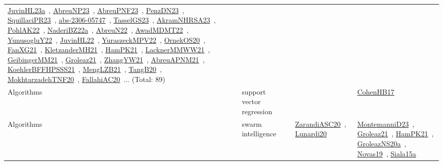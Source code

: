 {\begin{longtable}{lp{3cm}>{\raggedright\arraybackslash}p{6cm}>{\raggedright\arraybackslash}p{6cm}>{\raggedright\arraybackslash}p{8cm}}
\href{../works/JuvinHL23a.pdf}{JuvinHL23a}~\cite{JuvinHL23a}, \href{../works/AbreuNP23.pdf}{AbreuNP23}~\cite{AbreuNP23}, \href{../works/AbreuPNF23.pdf}{AbreuPNF23}~\cite{AbreuPNF23}, \href{../works/PenzDN23.pdf}{PenzDN23}~\cite{PenzDN23}, \href{../works/SquillaciPR23.pdf}{SquillaciPR23}~\cite{SquillaciPR23}, \href{../works/abs-2306-05747.pdf}{abs-2306-05747}~\cite{abs-2306-05747}, \href{../works/TasselGS23.pdf}{TasselGS23}~\cite{TasselGS23}, \href{../works/AkramNHRSA23.pdf}{AkramNHRSA23}~\cite{AkramNHRSA23}, \href{../works/PohlAK22.pdf}{PohlAK22}~\cite{PohlAK22}, \href{../works/NaderiBZ22a.pdf}{NaderiBZ22a}~\cite{NaderiBZ22a}, \href{../works/AbreuN22.pdf}{AbreuN22}~\cite{AbreuN22}, \href{../works/AwadMDMT22.pdf}{AwadMDMT22}~\cite{AwadMDMT22}, \href{../works/YunusogluY22.pdf}{YunusogluY22}~\cite{YunusogluY22}, \href{../works/JuvinHL22.pdf}{JuvinHL22}~\cite{JuvinHL22}, \href{../works/YuraszeckMPV22.pdf}{YuraszeckMPV22}~\cite{YuraszeckMPV22}, \href{../works/OrnekOS20.pdf}{OrnekOS20}~\cite{OrnekOS20}, \href{../works/FanXG21.pdf}{FanXG21}~\cite{FanXG21}, \href{../works/KletzanderMH21.pdf}{KletzanderMH21}~\cite{KletzanderMH21}, \href{../works/HamPK21.pdf}{HamPK21}~\cite{HamPK21}, \href{../works/LacknerMMWW21.pdf}{LacknerMMWW21}~\cite{LacknerMMWW21}, \href{../works/GeibingerMM21.pdf}{GeibingerMM21}~\cite{GeibingerMM21}, \href{../works/Groleaz21.pdf}{Groleaz21}~\cite{Groleaz21}, \href{../works/ZhangYW21.pdf}{ZhangYW21}~\cite{ZhangYW21}, \href{../works/AbreuAPNM21.pdf}{AbreuAPNM21}~\cite{AbreuAPNM21}, \href{../works/KoehlerBFFHPSSS21.pdf}{KoehlerBFFHPSSS21}~\cite{KoehlerBFFHPSSS21}, \href{../works/MengLZB21.pdf}{MengLZB21}~\cite{MengLZB21}, \href{../works/TangB20.pdf}{TangB20}~\cite{TangB20}, \href{../works/MokhtarzadehTNF20.pdf}{MokhtarzadehTNF20}~\cite{MokhtarzadehTNF20}, \href{../works/FallahiAC20.pdf}{FallahiAC20}~\cite{FallahiAC20}... (Total: 89)\\
\index{support vector regression}\index{Algorithms!support vector regression}Algorithms & support vector regression &  &  & \href{../works/CohenHB17.pdf}{CohenHB17}~\cite{CohenHB17}\\
\index{swarm intelligence}\index{Algorithms!swarm intelligence}Algorithms & swarm intelligence &  & \href{../works/ZarandiASC20.pdf}{ZarandiASC20}~\cite{ZarandiASC20}, \href{../works/Lunardi20.pdf}{Lunardi20}~\cite{Lunardi20} & \href{../works/MontemanniD23.pdf}{MontemanniD23}~\cite{MontemanniD23}, \href{../works/Groleaz21.pdf}{Groleaz21}~\cite{Groleaz21}, \href{../works/HamPK21.pdf}{HamPK21}~\cite{HamPK21}, \href{../works/GroleazNS20a.pdf}{GroleazNS20a}~\cite{GroleazNS20a}, \href{../works/Novas19.pdf}{Novas19}~\cite{Novas19}, \href{../works/Siala15a.pdf}{Siala15a}~\cite{Siala15a}\\

\end{longtable}}
